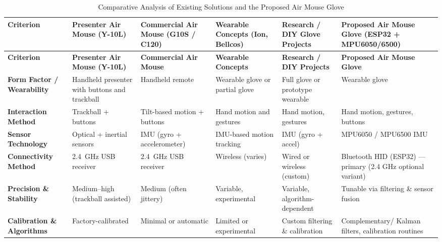 \begin{longtable}{|p{2.9cm}|p{2.35cm}|p{2.35cm}|p{2.35cm}|p{2.35cm}|p{2.35cm}|}
\caption{Comparative Analysis of Existing Solutions and the Proposed Air Mouse Glove}
\label{tbl:comparative_air_mouse} \\
\hline
\rowcolor{gray!20}
\textbf{Criterion} &
\textbf{Presenter Air Mouse (Y-10L)\cite{airmouse_y10l}} &
\textbf{Commercial Air Mouse (G10S / C120)\cite{antena_airmouse,mshop_airmouse_c120}} &
\textbf{Wearable Concepts (Ion, Bellcos)\cite{ergonomic_airmouse_glove,bellcos_wireless_mouse}} &
\textbf{Research / DIY Glove Projects\cite{cornell_airmouse_project,youtube_airmouse_demo}} &
\textbf{Proposed Air Mouse Glove (ESP32 + MPU6050/6500)} \\
\hline
\endfirsthead

\hline
\rowcolor{gray!20}
\textbf{Criterion} &
\textbf{Presenter Air Mouse (Y-10L)} &
\textbf{Commercial Air Mouse} &
\textbf{Wearable Concepts} &
\textbf{Research / DIY Projects} &
\textbf{Proposed Air Mouse Glove} \\
\hline
\endhead

\textbf{Form Factor / Wearability} &
Handheld presenter with buttons and trackball &
Handheld remote &
Wearable glove or partial glove &
Full glove or prototype wearable &
Wearable glove \\
\hline

\textbf{Interaction Method} &
Trackball + buttons &
Tilt-based motion + buttons &
Hand motion and gestures &
Hand motion, gestures &
Hand motion, gestures, buttons \\
\hline

\textbf{Sensor Technology} &
Optical + inertial sensors &
IMU (gyro + accelerometer) &
IMU-based motion tracking &
IMU (gyro + accel) &
MPU6050 / MPU6500 IMU \\
\hline

\textbf{Connectivity Method} &
2.4~GHz USB receiver &
2.4~GHz USB receiver &
Wireless (varies) &
Wired or wireless (custom) &
Bluetooth HID (ESP32) — primary (2.4 GHz optional variant) \\
\hline

\textbf{Precision \& Stability} &
Medium--high (trackball assisted) &
Medium (often jittery) &
Variable, experimental &
Variable, algorithm-dependent &
Tunable via filtering \& sensor fusion \\
\hline

\textbf{Calibration \& Algorithms} &
Factory-calibrated &
Minimal or automatic &
Limited or experimental &
Custom filtering \& calibration &
Complementary/ Kalman filters, calibration routines \\
\hline


\end{longtable}
